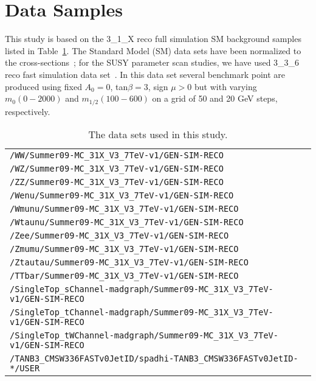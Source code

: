 \section{Data Samples}
\label{sec:datasamples}
This study is based on the 3\_1\_X reco full simulation SM background samples
listed in Table~\ref{tab:datasets}.  The Standard Model (SM) data sets have been normalized 
to the cross-sections~\cite{mcsusy};  for the SUSY parameter scan studies, we have used  
3\_3\_6 reco fast simulation data set~\cite{fast10}. In this data set several benchmark 
point are produced using fixed $A_0 = 0 $, tan$\beta = 3$, sign $\mu > 0 $ but with varying 
$m_{0} (0 - 2000)$ and $m_{1/2} (100 - 600)$ on a grid of 50 and 20 GeV steps, respectively.

\begin{table}[hbt]
\begin{center}
\begin{tabular}{|l|}\hline
{\tt /WW/Summer09-MC\_31X\_V3\_7TeV-v1/GEN-SIM-RECO} \\
{\tt /WZ/Summer09-MC\_31X\_V3\_7TeV-v1/GEN-SIM-RECO} \\
{\tt /ZZ/Summer09-MC\_31X\_V3\_7TeV-v1/GEN-SIM-RECO} \\
{\tt /Wenu/Summer09-MC\_31X\_V3\_7TeV-v1/GEN-SIM-RECO} \\
{\tt /Wmunu/Summer09-MC\_31X\_V3\_7TeV-v1/GEN-SIM-RECO} \\
{\tt /Wtaunu/Summer09-MC\_31X\_V3\_7TeV-v1/GEN-SIM-RECO} \\
{\tt /Zee/Summer09-MC\_31X\_V3\_7TeV-v1/GEN-SIM-RECO} \\
{\tt /Zmumu/Summer09-MC\_31X\_V3\_7TeV-v1/GEN-SIM-RECO} \\
{\tt /Ztautau/Summer09-MC\_31X\_V3\_7TeV-v1/GEN-SIM-RECO} \\
{\tt /TTbar/Summer09-MC\_31X\_V3\_7TeV-v1/GEN-SIM-RECO} \\
{\tt /SingleTop\_sChannel-madgraph/Summer09-MC\_31X\_V3\_7TeV-v1/GEN-SIM-RECO} \\
{\tt /SingleTop\_tChannel-madgraph/Summer09-MC\_31X\_V3\_7TeV-v1/GEN-SIM-RECO} \\
{\tt /SingleTop\_tWChannel-madgraph/Summer09-MC\_31X\_V3\_7TeV-v1/GEN-SIM-RECO} \\
{\tt /TANB3\_CMSW336FASTv0JetID/spadhi-TANB3\_CMSW336FASTv0JetID-*/USER} \\
\hline
\end{tabular}
\caption{The data sets used in this study.\label{tab:datasets}}
\end{center}
\end{table}

